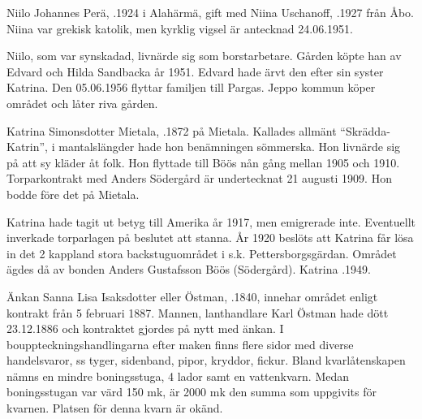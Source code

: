 %



%
Niilo Johannes Perä, .1924 i Alahärmä, gift med Niina Uschanoff, .1927 från Åbo. Niina var grekisk katolik, men kyrklig vigsel är antecknad 24.06.1951.
\begin{jhchildren}
  \item {}
  \item {}
  \item {}
\end{jhchildren}
Niilo, som var synskadad, livnärde sig som borstarbetare. Gården köpte han av Edvard och Hilda Sandbacka år 1951. Edvard hade ärvt den efter sin syster Katrina. Den 05.06.1956 flyttar familjen till Pargas. Jeppo kommun köper området och låter riva gården.


%
Katrina Simonsdotter Mietala, .1872 på Mietala. Kallades allmänt ``Skrädda-Katrin'', i mantalslängder hade hon benämningen sömmerska. Hon livnärde sig på att sy kläder åt folk. Hon flyttade till Böös nån gång mellan 1905 och 1910. Torparkontrakt med Anders Södergård är undertecknat 21 augusti 1909. Hon bodde före det på Mietala.

Katrina hade tagit ut betyg till Amerika år 1917, men emigrerade inte. Eventuellt inverkade torparlagen på beslutet att stanna. År 1920 beslöts att Katrina får lösa in det 2 kappland stora backstuguområdet i s.k. Pettersborgsgärdan. Området ägdes då av bonden Anders 				Gustafsson Böös (Södergård). Katrina .1949.


%
Änkan Sanna Lisa Isaksdotter eller Östman, .1840, innehar området enligt kontrakt från 5 februari 1887. Mannen, lanthandlare Karl Östman hade dött 23.12.1886 och kontraktet gjordes på nytt med änkan. I bouppteckningshandlingarna efter maken finns flere sidor med diverse handelsvaror, ss tyger, sidenband, pipor, kryddor, fickur. Bland kvarlåtenskapen nämns en mindre boningsstuga, 4 lador samt en vattenkvarn. Medan boningsstugan var värd 150 mk, är 2000 mk den summa som uppgivits för kvarnen. Platsen för denna kvarn är okänd.

